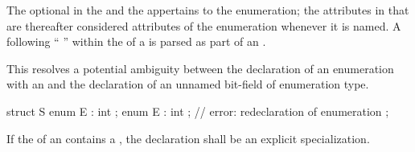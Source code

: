 The optional  in the  and
the  appertains to the enumeration; the attributes
in that  are thereafter considered attributes of the
enumeration whenever it is named.
A \tcode{:} following
``  ''
within the  of a 
is parsed as part of an .
\begin{note} This resolves a potential ambiguity between the declaration of an enumeration
with an  and the declaration of an unnamed bit-field of enumeration
type. \begin{example}

\begin{codeblock}
   struct S {
     enum E : int {};
     enum E : int {};           // error: redeclaration of enumeration
   };
\end{codeblock}

\end{example}
\end{note}
If the  of an  contains
a ,
the declaration shall be an explicit specialization.

